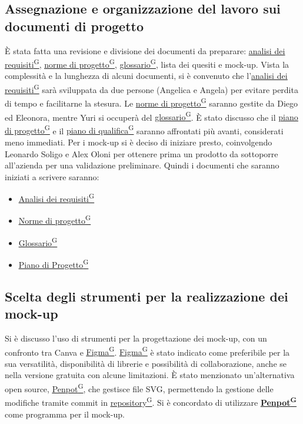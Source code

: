 \documentclass[a4paper,12pt]{article}
\providecommand{\glslink}[2]{\href{https://alittlebyte-19.github.io/Documentazione/glossario.html\#gls-#1}{\underline{#2}\textsuperscript{\scriptsize G}}}
\begin{document}
\subsection{Assegnazione e organizzazione del lavoro sui documenti di progetto}
È stata fatta una revisione e divisione dei documenti da preparare: 
\glslink{analisi-dei-requisiti-adr}{analisi dei requisiti}, \glslink{norme-di-progetto}{norme di progetto}, \glslink{glossario}{glossario}, lista dei quesiti e mock-up. Vista la complessità e la lunghezza di alcuni documenti, 
si è convenuto che l'\glslink{analisi-dei-requisiti-adr}{analisi dei requisiti} sarà sviluppata da due persone (Angelica e Angela) per evitare perdita di tempo e facilitarne la stesura. 
Le \glslink{norme-di-progetto}{norme di progetto} saranno gestite da Diego ed Eleonora, mentre Yuri si occuperà del \glslink{glossario}{glossario}. 
È stato discusso che il \glslink{piano-di-progetto}{piano di progetto} e il \glslink{piano-di-qualifica}{piano di qualifica} saranno affrontati più avanti, considerati meno immediati. 
Per i mock-up si è deciso di iniziare presto, coinvolgendo Leonardo Soligo e Alex Oloni per ottenere prima un prodotto da sottoporre all'azienda per una validazione preliminare.
Quindi i documenti che saranno iniziati a scrivere saranno:
\begin{itemize}
    \item \glslink{analisi-dei-requisiti-adr}{Analisi dei requisiti}
    \item \glslink{norme-di-progetto}{Norme di progetto}
    \item \glslink{glossario}{Glossario}
    \item \glslink{piano-di-progetto}{Piano di Progetto}
\end{itemize}

\subsection{Scelta degli strumenti per la realizzazione dei mock-up}
Si è discusso l'uso di strumenti per la progettazione dei mock-up, con un confronto tra Canva e \glslink{figma}{Figma}. 
\glslink{figma}{Figma} è stato indicato come preferibile per la sua versatilità, disponibilità di librerie e possibilità di collaborazione, 
anche se nella versione gratuita con alcune limitazioni. 
È stato menzionato un'alternativa open source, \glslink{penpot}{Penpot}, che gestisce file SVG, permettendo la gestione delle modifiche tramite commit in \glslink{repository}{repository}. 
Si è concordato di utilizzare \textbf{\glslink{penpot}{Penpot}} come programma per il mock-up.
\end{document}
